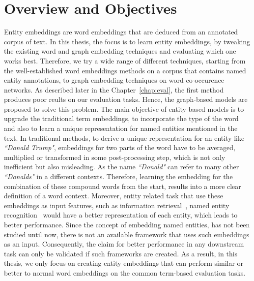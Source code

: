 \section{Overview and Objectives}\label{sec:entity_overview}
Entity embeddings are word embeddings that are deduced from an annotated corpus of text. In this thesis, the focus is to learn entity embeddings, by tweaking the existing word and graph embedding techniques and evaluating which one works best. Therefore, we try a wide range of different techniques, starting from the well-established word embeddings methods on a corpus that contains named entity annotations, to graph embedding techniques on word co-occurence networks. As described later in the Chapter~\ref{chap:eval}, the first method produces poor reults on our evaluation tasks. Hence, the graph-based models are proposed to solve this problem. The main objective of entity-based models is to upgrade the traditional term embeddings, to incorporate the type of the word and also to learn a unique representation for named entities mentioned in the text. In traditional methods, to derive a unique representation for an entity like \emph{``Donald Trump"}, embeddings for two parts of the word have to be averaged, multiplied or transformed in some post-processing step, which is not only inefficient but also misleading. As the name \emph{``Donald"} can refer to many other \emph{``Donalds"} in a different contexts. Therefore, learning the embedding for the combination of these compound words from the start, results into a more clear definition of a word context. Moreover, entity related task that use these embeddings as input features, such as information retrieval~, named entity recognition~ would have a better representation of each entity, which leads to better performance. Since the concept of embedding named entities, has not been studied until now, there is not an available framework that uses such embeddings as an input. Consequently, the claim for better performance in any downstream task can only be validated if such frameworks are created. As a result, in this thesis, we only focus on creating entity embeddings that can perform similar or better to normal word embeddings on the common term-based evaluation tasks. \\
